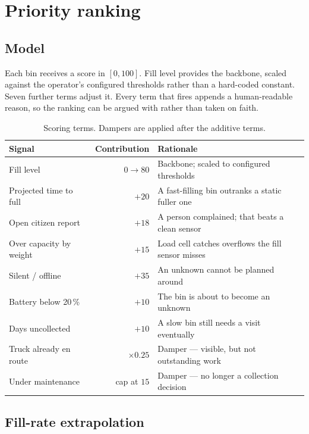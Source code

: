 \documentclass[11pt,a4paper]{article}
\begin{document}
\section{Priority ranking}

\subsection{Model}

Each bin receives a score in $[0,100]$. Fill level provides the backbone,
scaled against the operator's configured thresholds rather than a
hard-coded constant. Seven further terms adjust it. Every term that fires
appends a human-readable reason, so the ranking can be argued with rather
than taken on faith.

\begin{table}[h]
\centering\small
\begin{tabularx}{\textwidth}{lrX}
\toprule
\textbf{Signal} & \textbf{Contribution} & \textbf{Rationale} \\
\midrule
Fill level             & $0 \rightarrow 80$ & Backbone; scaled to configured thresholds \\
Projected time to full & $+20$ & A fast-filling bin outranks a static fuller one \\
Open citizen report    & $+18$ & A person complained; that beats a clean sensor \\
Over capacity by weight& $+15$ & Load cell catches overflows the fill sensor misses \\
Silent / offline       & $+35$ & An unknown cannot be planned around \\
Battery below 20\,\%   & $+10$ & The bin is about to become an unknown \\
Days uncollected       & $+10$ & A slow bin still needs a visit eventually \\
\midrule
Truck already en route & $\times 0.25$ & Damper --- visible, but not outstanding work \\
Under maintenance      & cap at $15$ & Damper --- no longer a collection decision \\
\bottomrule
\end{tabularx}
\caption{Scoring terms. Dampers are applied after the additive terms.}
\end{table}

\subsection{Fill-rate extrapolation}
\end{document}
